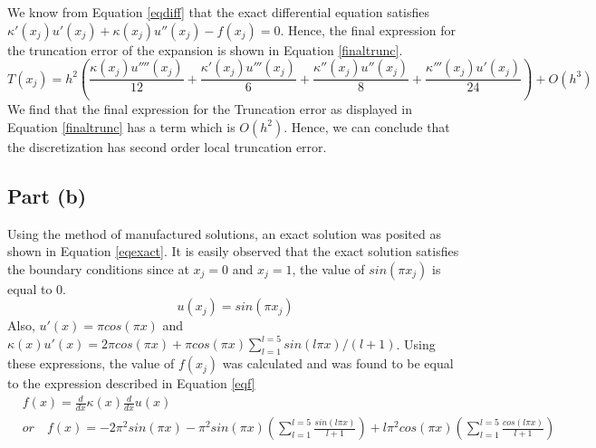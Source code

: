 \documentclass[12pt,dvipsnames]{article}
\begin{document}
We know from Equation \ref{eqdiff} that the exact differential equation satisfies $ \kappa'(x_j)u'(x_j)+ \kappa(x_j) u''(x_j) - f(x_j) = 0$. Hence, the final expression for the truncation error of the expansion is shown in Equation \ref{finaltrunc}.
\begin{equation}\label{finaltrunc}
    T(x_j) = h^2 \left( \frac{\kappa(x_j) u''''(x_j)}{12} + \frac{\kappa'(x_j) u'''(x_j)}{6} + \frac{\kappa''(x_j) u''(x_j)}{8} + \frac{\kappa'''(x_j) u'(x_j)}{24} \right) + O(h^3) 
\end{equation}
We find that the final expression for the Truncation error as displayed in Equation \ref{finaltrunc} has a term which is $O(h^2)$. Hence, we can conclude that the discretization has second order local truncation error.
\subsection{Part (b)}
Using the method of manufactured solutions, an exact solution was posited as shown in Equation \ref{eqexact}. It is easily observed that the exact solution satisfies the boundary conditions since at $x_j = 0$ and $x_j = 1$, the value of $sin(\pi x_j)$ is equal to $0$.
\begin{equation} \label{eqexact}
    u(x_j) = sin(\pi x_j)
\end{equation}
Also, $u'(x) = \pi cos(\pi x)$ and $ \kappa(x)u'(x) = 2 \pi cos(\pi x) + \pi cos(\pi x) \sum_{l = 1}^{l = 5} sin(l \pi x)/(l + 1) $. Using these expressions, the value of $f(x_j)$ was calculated and was found to be equal to the expression described in Equation \ref{eqf}
\begin{equation} \label{eqf}
\begin{aligned}
    & f(x) = \frac{d}{dx} \kappa(x) \frac{d}{dx} u(x) \\
    & or \quad f(x) = -2\pi^2 sin(\pi x) - \pi^2 sin(\pi x) \left( \sum_{l = 1}^{l = 5} \frac{sin(l \pi x)}{l + 1} \right) + l \pi^2 cos(\pi x) \left( \sum_{l = 1}^{l = 5} \frac{cos(l \pi x)}{ l + 1 } \right)
\end{aligned}
\end{equation}
\end{document}
